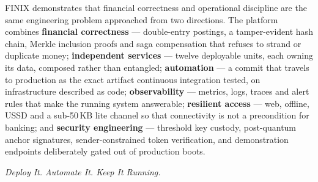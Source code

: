 \documentclass[11pt,a4paper]{article}
\begin{document}
FINIX demonstrates that financial correctness and operational discipline are the same engineering
problem approached from two directions. The platform combines \textbf{financial correctness} ---
double-entry postings, a tamper-evident hash chain, Merkle inclusion proofs and saga compensation
that refuses to strand or duplicate money; \textbf{independent services} --- twelve deployable
units, each owning its data, composed rather than entangled; \textbf{automation} --- a commit that
travels to production as the exact artifact continuous integration tested, on infrastructure
described as code; \textbf{observability} --- metrics, logs, traces and alert rules that make the
running system answerable; \textbf{resilient access} --- web, offline, USSD and a sub-50\,KB lite
channel so that connectivity is not a precondition for banking; and \textbf{security engineering}
--- threshold key custody, post-quantum anchor signatures, sender-constrained token verification,
and demonstration endpoints deliberately gated out of production boots.

\vspace{4mm}
\begin{center}
{\Large\itshape\color{finixnavy} Deploy It. Automate It. Keep It Running.}
\end{center}
\vspace{4mm}

\begin{center}
\end{center}
\end{document}
